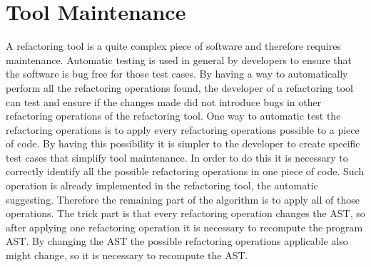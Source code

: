 \section{Tool Maintenance} %



A refactoring tool is a quite complex piece of software and therefore requires maintenance.
Automatic testing is used in general by developers to ensure that the software
is bug free for those test cases.
By having a way to automatically perform all the refactoring operations found,
the developer of a refactoring tool can test and ensure if the changes made did not introduce
bugs in other refactoring operations of the refactoring tool.
One way to automatic test the refactoring operations is to apply every refactoring
operations possible to a piece of code. By having this possibility it is simpler
to the developer to create specific test cases that simplify tool maintenance.
In order to do this it is necessary to correctly identify all the possible refactoring
operations in one piece of code. Such operation is already implemented in the refactoring
tool, the automatic suggesting.
Therefore the remaining part of the algorithm is to apply all of those operations.
The trick part is  that every refactoring operation changes the AST, so after
applying one refactoring operation it is necessary to recompute the program AST.
By changing the AST the possible refactoring operations applicable also might change,
so it is necessary to recompute the AST.


